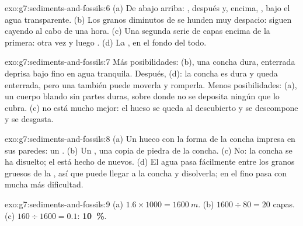 \begin{solution}{exo:g7:sediments-and-fossils:6}
(a) De abajo arriba: , después  y, encima, , bajo el agua
transparente. (b) Los granos diminutos de  se hunden muy despacio:
siguen cayendo al cabo de una hora. (c) Una segunda serie de capas encima
de la primera: otra vez  y luego . (d) La , en el fondo del
todo.
\end{solution}

\begin{solution}{exo:g7:sediments-and-fossils:7}
Más posibilidades: (b), una concha dura, enterrada deprisa bajo  fino
en agua tranquila. Después, (d): la concha es dura y queda enterrada, pero
una  también puede moverla y romperla. Menos posibilidades: (a), un
cuerpo blando sin partes duras, sobre  donde no se deposita ningún
 que lo cubra. (c) no está mucho mejor: el hueso se queda al
descubierto y se descompone y se desgasta.
\end{solution}

\begin{solution}{exo:g7:sediments-and-fossils:8}
(a) Un hueco con la forma de la concha impresa en sus paredes: un .
(b) Un , una copia de piedra de la concha. (c) No: la concha se
ha disuelto; el  está hecho de  nuevos. (d) El agua
pasa fácilmente entre los granos gruesos de la , así que puede llegar
a la concha y disolverla; en el  fino pasa con mucha más dificultad.
\end{solution}

\begin{solution}{exo:g7:sediments-and-fossils:9}
(a) $1.6 \times 1000 = \qty{1600}{m}$. (b) $1600 \div 80 = 20$ capas.
(c) $160 \div 1600 = 0.1$: \textbf{10~\%}.
\end{solution}

